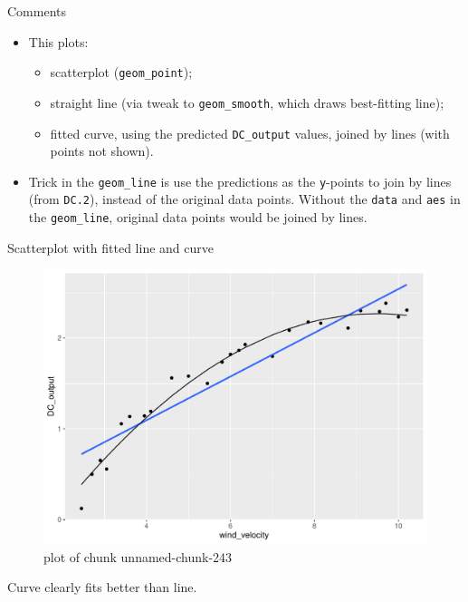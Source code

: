 \documentclass[ignorenonframetext,]{beamer}
\providecommand{\tightlist}{%
  \setlength{\itemsep}{0pt}\setlength{\parskip}{0pt}}
\begin{document}
\begin{frame}[fragile]{Comments}
\protect\hypertarget{comments-15}{}

\begin{itemize}
\tightlist
\item
  This plots:

  \begin{itemize}
  \tightlist
  \item
    scatterplot (\texttt{geom\_point});
  \item
    straight line (via tweak to \texttt{geom\_smooth}, which draws
    best-fitting line);
  \item
    fitted curve, using the predicted \texttt{DC\_output} values, joined
    by lines (with points not shown).
  \end{itemize}
\item
  Trick in the \texttt{geom\_line} is use the predictions as the
  \texttt{y}-points to join by lines (from \texttt{DC.2}), instead of
  the original data points. Without the \texttt{data} and \texttt{aes}
  in the \texttt{geom\_line}, original data points would be joined by
  lines.
\end{itemize}

\end{frame}

\begin{frame}{Scatterplot with fitted line and curve}
\protect\hypertarget{scatterplot-with-fitted-line-and-curve-1}{}

\begin{figure}
\centering
\includegraphics{figure/unnamed-chunk-243-1.pdf}
\caption{plot of chunk unnamed-chunk-243}
\end{figure}

Curve clearly fits better than line.

\end{frame}
\end{document}
